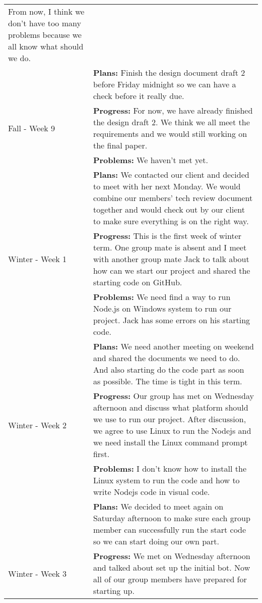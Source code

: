\begin{longtable}[ht]{| p{1.5cm} | p{13.5cm} |}
     From now, I think we don't have too many problems because we all know what should we do.
     \\ & \textbf{Plans:}
     Finish the design document draft 2 before Friday midnight so we can have a check before it really due.
     \\
     \hline
     Fall - Week 9 &
     \textbf{Progress:}
     For now, we have already finished the design draft 2.
     We think we all meet the requirements and we would still working on the final paper.
     \\ & \textbf{Problems:}
     We haven't met yet.
     \\ & \textbf{Plans:}
     We contacted our client and decided to meet with her next Monday.
     We would combine our members' tech review document together and would check out by our client to make sure everything is on the right way.
     \\
     \hline
     Winter - Week 1 &
     \textbf{Progress:}
     This is the first week of winter term.
     One group mate is absent and I meet with another group mate Jack to talk about how can we start our project and shared the starting code on GitHub.
     \\ & \textbf{Problems:}
     We need find a way to run Node.js on Windows system to run our project.
     Jack has some errors on his starting code.
     \\ & \textbf{Plans:}
     We need another meeting on weekend and shared the documents we need to do.
     And also starting do the code part as soon as possible. The time is tight in this term.
     \\
     \hline
     Winter - Week 2 &
     \textbf{Progress:}
     Our group has met on Wednesday afternoon and discuss what platform should we use to run our project.
     After discussion, we agree to use Linux to run the Nodejs and we need install the Linux command prompt first.
     \\ & \textbf{Problems:}
     I don't know how to install the Linux system to run the code and how to write Nodejs code in visual code.
     \\ & \textbf{Plans:}
     We decided to meet again on Saturday afternoon to make sure each group member can successfully run the start code so we can start doing our own part.
     \\
     \hline
     Winter - Week 3 &
     \textbf{Progress:}
     We met on Wednesday afternoon and talked about set up the initial bot.
     Now all of our group members have prepared for starting up.

\end{longtable}
